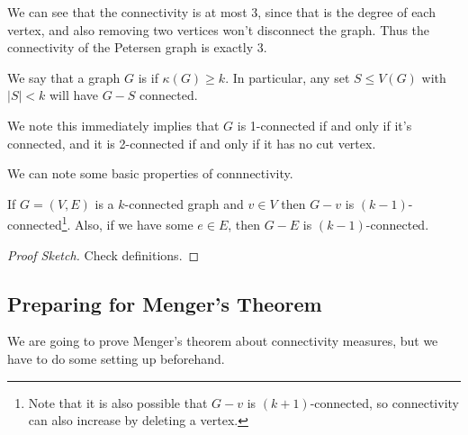 \documentclass[a4paper]{scrartcl}
\begin{document}
\begin{example}
\begin{center}

	\end{center}
We can see that the connectivity is at most $3$, since that is the degree of each vertex, and also removing two vertices won't disconnect the graph. Thus the connectivity of the Petersen graph is exactly 3.
\end{example}

\begin{definition}[$k$-Connected]
We say that a graph $G$ is  if $\kappa(G) \geq k$. In particular, any set $S \leq V(G)$ with $|S| < k$	will have $G - S$ connected.
\end{definition}

We note this immediately implies that $G$ is 1-connected if and only if it's connected, and it is 2-connected if and only if it has no cut vertex.

We can note some basic properties of connnectivity.

\begin{lemma}
	If $G = (V, E)$ is a $k$-connected graph and $v \in V$ then $G - v$ is $(k - 1)$-connected\footnote{Note that it is also possible that $G - v$ is $(k + 1)$-connected, so connectivity can also increase by deleting a vertex.}. 
	Also, if we have some $e \in E$, then $G - E$ is $(k - 1)$-connected.
\end{lemma}
\begin{proof}[Proof Sketch]
Check definitions.
\end{proof}

\subsection{Preparing for Menger's Theorem}

We are going to prove Menger's theorem about connectivity measures, but we have to do some setting up beforehand.
\end{document}
